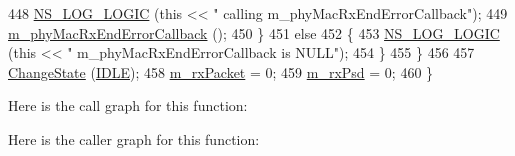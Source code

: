 \begin{DoxyCode}
448           \hyperlink{group__logging_ga88acd260151caf2db9c0fc84997f45ce}{NS\_LOG\_LOGIC} (\textcolor{keyword}{this} << \textcolor{stringliteral}{" calling m\_phyMacRxEndErrorCallback"});
449           \hyperlink{classns3_1_1HalfDuplexIdealPhy_aa3c7a178ca01aa7ac1408249c9fef3f2}{m\_phyMacRxEndErrorCallback} ();
450         \}
451       \textcolor{keywordflow}{else}
452         \{
453           \hyperlink{group__logging_ga88acd260151caf2db9c0fc84997f45ce}{NS\_LOG\_LOGIC} (\textcolor{keyword}{this} << \textcolor{stringliteral}{" m\_phyMacRxEndErrorCallback is NULL"});
454         \}
455     \}
456 
457   \hyperlink{classns3_1_1HalfDuplexIdealPhy_a9eb5135bc6ae1ddb50920c92f64222cd}{ChangeState} (\hyperlink{classns3_1_1HalfDuplexIdealPhy_acc684e2a6ce03ae8ff429ce480f61c3aaf6ddf02c196dc56c189b183e784f2094}{IDLE});
458   \hyperlink{classns3_1_1HalfDuplexIdealPhy_aa1122da72d7425d4bebb0cd65d442db1}{m\_rxPacket} = 0;
459   \hyperlink{classns3_1_1HalfDuplexIdealPhy_a17dfdb0350a690c50953deb78318025e}{m\_rxPsd} = 0;
460 \}
\end{DoxyCode}


Here is the call graph for this function\+:




Here is the caller graph for this function\+:


